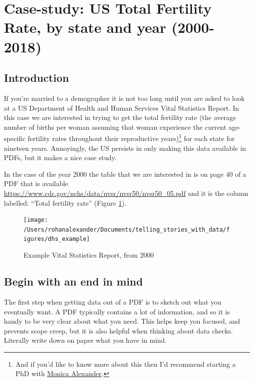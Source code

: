 \documentclass[
]{book}
\begin{document}
\hypertarget{case-study-us-total-fertility-rate-by-state-and-year-2000-2018}{%
\section{Case-study: US Total Fertility Rate, by state and year (2000-2018)}\label{case-study-us-total-fertility-rate-by-state-and-year-2000-2018}}

\hypertarget{introduction-12}{%
\subsection{Introduction}\label{introduction-12}}

If you're married to a demographer it is not too long until you are asked to look at a US Department of Health and Human Services Vital Statistics Report. In this case we are interested in trying to get the total fertility rate (the average number of births per woman assuming that woman experience the current age-specific fertility rates throughout their reproductive years)\footnote{And if you'd like to know more about this then I'd recommend starting a PhD with \href{https://www.monicaalexander.com/}{Monica Alexander}.} for each state for nineteen years. Annoyingly, the US persists in only making this data available in PDFs, but it makes a nice case study.

In the case of the year 2000 the table that we are interested in is on page 40 of a PDF that is available \url{https://www.cdc.gov/nchs/data/nvsr/nvsr50/nvsr50_05.pdf} and it is the column labelled: ``Total fertility rate'' (Figure \ref{fig:dhsexample}).

\begin{figure}
\texttt{[image: /Users/rohanalexander/Documents/telling\_stories\_with\_data/figures/dhs\_example]} \caption{Example Vital Statistics Report, from 2000}\label{fig:dhsexample}
\end{figure}

\hypertarget{begin-with-an-end-in-mind}{%
\subsection{Begin with an end in mind}\label{begin-with-an-end-in-mind}}

The first step when getting data out of a PDF is to sketch out what you eventually want. A PDF typically contains a lot of information, and so it is handy to be very clear about what you need. This helps keep you focused, and prevents scope creep, but it is also helpful when thinking about data checks. Literally write down on paper what you have in mind.
\end{document}
